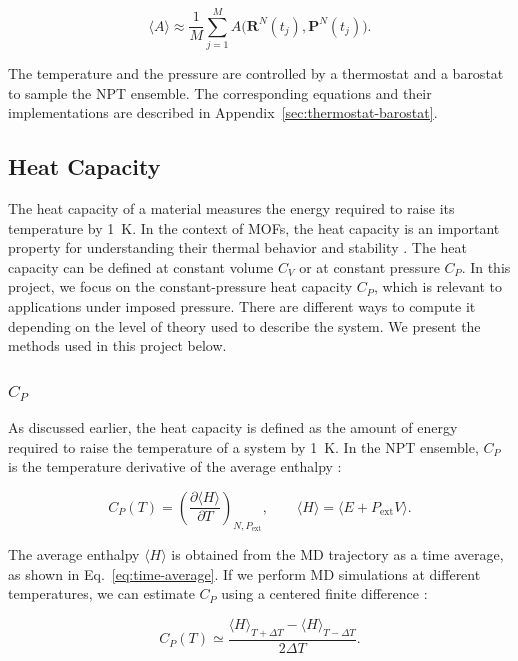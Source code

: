 \documentclass[12pt,a4paper]{article}
\numberwithin{equation}{section}
\begin{document}
\begin{equation}
  \langle A\rangle
  \approx\frac{1}{M}\sum_{j=1}^{M}A\bigl(\bm R^N(t_j),\bm P^N(t_j)\bigr).
  \label{eq:time-average}
\end{equation}

The temperature and the pressure are controlled by a thermostat and a barostat
to sample the NPT ensemble. The corresponding equations and their
implementations are described in Appendix~\ref{sec:thermostat-barostat}.

\subsection{Heat Capacity}
\label{sec:heat-capacity}

The heat capacity of a material measures the energy required to raise its temperature by \SI{1}{K}.
In the context of MOFs, the heat capacity is an important property for understanding their thermal behavior and stability \cite{kapil2019}.
The heat capacity can be defined at constant volume $C_V$ or at constant pressure $C_P$.
In this project, we focus on the constant-pressure heat capacity $C_P$,
which is relevant to applications under imposed pressure.
There are different ways to compute it depending on the level of theory used to describe the system.
We present the methods used in this project below.

\subsubsection{$C_P$}
\label{sec:md-response}

As discussed earlier, the heat capacity is defined as the amount of energy required to raise the temperature of a system by \SI{1}{K}.
In the NPT ensemble, $C_P$ is the temperature derivative of the average enthalpy \cite{tuckerman2023}:

\begin{equation}
  C_P(T)=\left(\frac{\partial\langle H\rangle}{\partial T}\right)_{N,P_{\mathrm{ext}}},
  \qquad \langle H\rangle=\langle E+P_{\mathrm{ext}}V\rangle.
  \label{eq:cp-enthalpy}
\end{equation}

The average enthalpy $\langle H\rangle$ is obtained from the MD trajectory as a time average, as shown in Eq.~\eqref{eq:time-average}.
If we perform MD simulations at different temperatures, we can estimate $C_P$ using a centered finite difference \cite{kapil2019}:

\begin{equation}
  C_P(T)\simeq
  \frac{\langle H\rangle_{T+\Delta T}-\langle H\rangle_{T-\Delta T}}
       {2\Delta T}.
  \label{eq:finite-difference-cp}
\end{equation}
\end{document}
